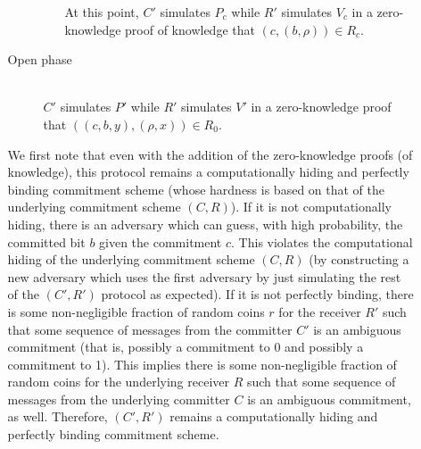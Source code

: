 \documentclass[draft]{article}
\begin{document}
\begin{enumerate}
\begin{enumerate}
\begin{description}
\begin{enumerate}
        At this point, $C'$ simulates $P_c$ while $R'$ simulates $V_c$ in a zero-knowledge proof of knowledge that $(c, (b, \rho))\in R_c$.
      \end{enumerate}
    \item[Open phase] \hfill \\
      $C'$ simulates $P'$ while $R'$ simulates $V'$ in a zero-knowledge proof that $((c, b, y), (\rho, x))\in R_0$.
    \end{description}
    We first note that even with the addition of the zero-knowledge proofs (of knowledge), this protocol remains a computationally hiding and perfectly binding commitment scheme (whose hardness is based on that of the underlying commitment scheme $(C, R)$).
    If it is not computationally hiding, there is an adversary which can guess, with high probability, the committed bit $b$ given the commitment $c$.
    This violates the computational hiding of the underlying commitment scheme $(C, R)$ (by constructing a new adversary which uses the first adversary by just simulating the rest of the $(C', R')$ protocol as expected).
    If it is not perfectly binding, there is some non-negligible fraction of random coins $r$ for the receiver $R'$ such that some sequence of messages from the committer $C'$ is an ambiguous commitment (that is, possibly a commitment to 0 and possibly a commitment to 1).
    This implies there is some non-negligible fraction of random coins for the underlying receiver $R$ such that some sequence of messages from the underlying committer $C$ is an ambiguous commitment, as well.
    Therefore, $(C', R')$ remains a computationally hiding and perfectly binding commitment scheme.


\end{enumerate}
\end{enumerate}
\end{document}
